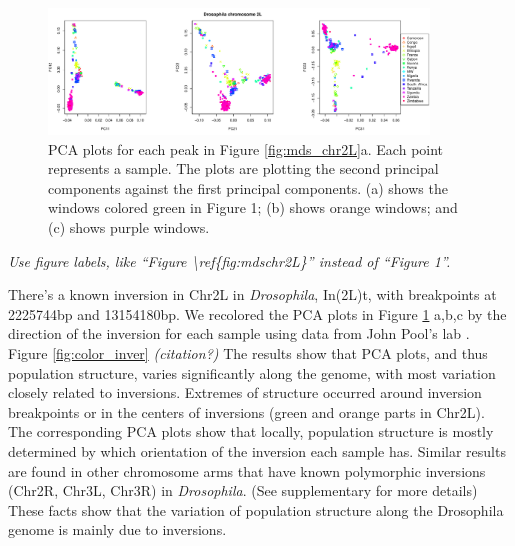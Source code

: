 \documentclass[11pt, oneside]{article}   	%
\newcommand{\plr}[1]{{\em \color{blue} #1}}
\begin{document}
\begin{figure}
    \begin{center}
       \includegraphics[width=0.9\textwidth]{Fig2_all_pca_plots_for_Chr2L_3peaks_byMDS}
    \end{center}
    \caption{
        PCA plots for each peak in Figure \ref{fig:mds_chr2L}a. 
        Each point represents a sample. 
        The plots are plotting the second principal components against the first principal components. 
        (a) shows the windows colored green in Figure 1; 
        (b) shows orange windows; and (c) shows purple windows.
         \label{fig:pca_chr2L}
    }
\end{figure}

\plr{Use figure labels, like ``Figure {\textbackslash}ref\{fig:mds{\textunderscore}chr2L\}'' instead of ``Figure 1''.}

There's a known inversion in Chr2L in \textit{Drosophila}, In(2L)t, with breakpoints at 2225744bp and 13154180bp. \citep{corbett2012population} We recolored the PCA plots in Figure \ref{fig:pca_chr2L} a,b,c by the direction of the inversion for each sample using data from John Pool's lab \citep{lack2015drosophila}. Figure \ref{fig:color_inver}
\plr{(citation?)}
The results show that PCA plots, and thus population structure, varies significantly along the genome, with most variation closely related to inversions. 
Extremes of structure occurred around inversion breakpoints or in the centers of inversions (green and orange parts in Chr2L).
The corresponding PCA plots show that locally, population structure is mostly determined by which orientation of the inversion each sample has.
Similar results are found in other chromosome arms that have known polymorphic inversions (Chr2R, Chr3L, Chr3R) in \textit{Drosophila}. (See supplementary for more details)
These facts show that the variation of population structure along the Drosophila genome is mainly due to inversions.
\end{document}

